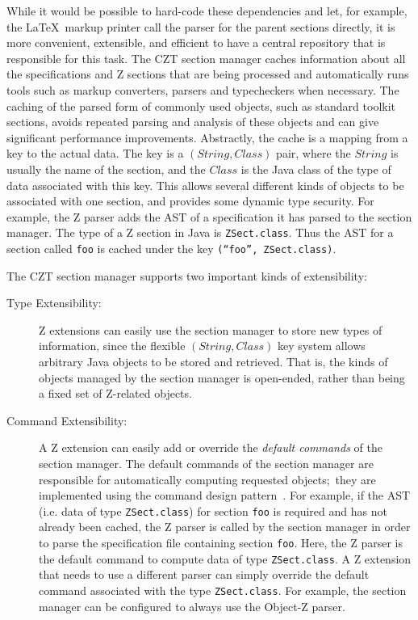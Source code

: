 \documentclass{llncs}
\newcommand{\Interface}[1]{\texttt{#1}}
\begin{document}
  While it would be possible to hard-code these dependencies and let, for
  example, the \LaTeX\ markup printer call the parser for the parent
  sections directly, it is more convenient, extensible, and efficient
  to have a central repository that is responsible for this task.
  The CZT section manager caches information about all the
  specifications and Z sections that are being processed and
  automatically runs tools such as markup converters, parsers and
  typecheckers when necessary.  The caching of the parsed form of
  commonly used objects, such as standard toolkit sections, avoids
  repeated parsing and analysis of these objects and can give significant
  performance improvements.  Abstractly, the cache is a
  mapping from a key to the actual data.  The key is a $(String,Class)$ pair,
  where the $String$ is usually the name of the section, and the $Class$ is
  the Java class of the type of data associated with this key.  This allows
  several different kinds of objects to be associated with one section,
  and provides some dynamic type security.
  For example, the Z parser adds the AST of a specification 
  it has parsed to the section manager.  The type of a Z section in Java is
  \Interface{ZSect.class}. Thus the AST for a section called \texttt{foo} is
  cached under the key \texttt{(``foo'',~ZSect.class)}.

  The CZT section manager supports two important kinds of extensibility:
  \begin{description}
  \item[Type Extensibility:] Z extensions can easily use the section
    manager to store new types of information, since the flexible
    $(String,Class)$ key system allows arbitrary Java objects to be stored
    and retrieved.  That is, the kinds of objects managed by the section 
    manager is open-ended, rather than being a fixed set of Z-related objects.
  \item[Command Extensibility:] A Z extension can easily add or override
    the \emph{default commands} of the section manager.  
    The default commands of the section manager are responsible for
    automatically computing requested objects;~they are
    implemented using the command design pattern~\cite{GamEA:95}. For
    example, if the AST (i.e. data of type \Interface{ZSect.class})
    for section \texttt{foo} is required and has not already been
    cached, the Z parser is called by the section manager in order to
    parse the specification file containing section \texttt{foo}.
    Here, the Z parser is the default command to compute data of type
    \Interface{ZSect.class}.  A Z extension that needs to use a different
    parser can simply override the default command associated with
    the type \Interface{ZSect.class}.  For example, the section
    manager can be configured to always use the Object-Z parser.
    \end{description}
\end{document}
